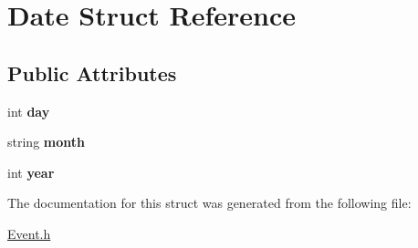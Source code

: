 \hypertarget{struct_date}{}\section{Date Struct Reference}
\label{struct_date}
\subsection*{Public Attributes}
\begin{DoxyCompactItemize}
\item 
\hypertarget{struct_date_a5b192adcabf2b2871e3f0b76c1ec1601}{}\label{struct_date_a5b192adcabf2b2871e3f0b76c1ec1601} 
int {\bfseries day}
\item 
\hypertarget{struct_date_a90d5c3971e7bcf73d47bdd986964905e}{}\label{struct_date_a90d5c3971e7bcf73d47bdd986964905e} 
string {\bfseries month}
\item 
\hypertarget{struct_date_a3eeced2ed56bc95d56782b9e738db8ea}{}\label{struct_date_a3eeced2ed56bc95d56782b9e738db8ea} 
int {\bfseries year}
\end{DoxyCompactItemize}


The documentation for this struct was generated from the following file\+:\begin{DoxyCompactItemize}
\item 
\hyperlink{_event_8h}{Event.\+h}\end{DoxyCompactItemize}
